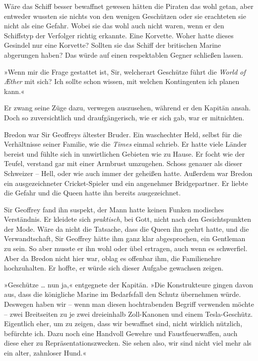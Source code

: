 Wäre das Schiff besser bewaffnet gewesen hätten die Piraten das
wohl getan, aber entweder wussten sie nichts von den wenigen
Geschützen oder sie erachteten sie nicht als eine Gefahr. Wobei sie
das wohl auch nicht waren, wenn er den Schiffstyp der Verfolger
richtig erkannte. Eine Korvette. Woher hatte dieses Gesindel nur
eine Korvette? Sollten sie das Schiff der britischen Marine
abgerungen haben? Das würde auf einen respektablen Gegner schließen
lassen.

»Wenn mir die Frage gestattet ist, Sir, welcherart Geschütze führt
die \textit{World of Æther} mit sich? Ich sollte schon wissen, mit welchen
Kontingenten ich planen kann.«

Er zwang seine Züge dazu, verwegen auszusehen, während er den
Kapitän ansah. Doch so zuversichtlich und draufgängerisch, wie er
sich gab, war er mitnichten.

\bigpar

 Bredon war Sir Geoffreys ältester
Bruder. Ein waschechter Held, selbst für die Verhältnisse seiner
Familie, wie die \textit{Times} einmal schrieb. Er hatte viele Länder
bereist und fühlte sich in unwirtlichen Gebieten wie zu Hause. Er
focht wie der Teufel, verstand gar mit einer Armbrust umzugehen.
Schoss genauer als dieser Schweizer – Hell, oder wie auch immer der
geheißen hatte. Außerdem war Bredon ein ausgezeichneter
Cricket-Spieler und ein angenehmer Bridgepartner. Er liebte die
Gefahr und die Queen hatte ihn bereits ausgezeichnet.

Sir Geoffrey fand ihn suspekt, der Mann hatte keinen Funken
modisches Verständnis. Er kleidete sich \emph{praktisch}, bei Gott, nicht
nach den Gesichtspunkten der Mode. Wäre da nicht die Tatsache, dass
die Queen ihn geehrt hatte, und die Verwandtschaft, Sir Geoffrey
hätte ihm ganz klar abgesprochen, ein Gentleman zu sein. So aber
musste er ihn wohl oder übel ertragen, auch wenn es schwerfiel.
Aber da Bredon nicht hier war, oblag es offenbar ihm, die
Familienehre hochzuhalten. Er hoffte, er würde sich dieser Aufgabe
gewachsen zeigen.

»Geschütze \ldots{} nun ja,« entgegnete der Kapitän. »Die Konstrukteure
gingen davon aus, dass die königliche Marine im Bedarfsfall den
Schutz übernehmen würde. Deswegen haben wir – wenn man diesen
hochtrabenden Begriff verwenden möchte – zwei Breitseiten zu je
zwei dreieinhalb Zoll-Kanonen und einem Tesla-Geschütz. Eigentlich
eher, um zu zeigen, dass wir bewaffnet sind, nicht wirklich
nützlich, befürchte ich. Dazu noch eine Handvoll Gewehre und
Faustfeuerwaffen, auch diese eher zu Repräsentationszwecken. Sie
sehen also, wir sind nicht viel mehr als ein alter, zahnloser
Hund.«

